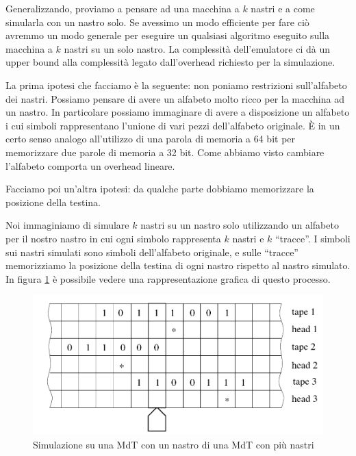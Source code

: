 

Generalizzando, proviamo a pensare ad una macchina a $k$ nastri e a come simularla con un nastro
solo. Se avessimo un modo efficiente per fare ciò avremmo un modo generale per eseguire un qualsiasi
algoritmo eseguito sulla macchina a $k$ nastri su un solo nastro. La complessità dell'emulatore ci
dà un upper bound alla complessità legato dall'overhead richiesto per la simulazione.

La prima ipotesi che facciamo è la seguente: non poniamo restrizioni sull'alfabeto dei nastri.
Possiamo pensare di avere un alfabeto molto ricco per la macchina ad un nastro. In particolare
possiamo immaginare di avere a disposizione un alfabeto i cui simboli rappresentano l'unione di vari
pezzi dell'alfabeto originale. È in un certo senso analogo all'utilizzo di una parola di memoria a
64 bit per memorizzare due parole di memoria a 32 bit. Come abbiamo visto cambiare l'alfabeto
comporta un overhead lineare.

Facciamo poi un'altra ipotesi: da qualche parte dobbiamo memorizzare la posizione della testina.

Noi immaginiamo di simulare $k$ nastri su un nastro solo utilizzando un alfabeto per il nostro
nastro in cui ogni simbolo rappresenta $k$ nastri e $k$ ``tracce''. I simboli sui nastri simulati
sono simboli dell'alfabeto originale, e sulle ``tracce'' memorizziamo la posizione della testina di
ogni nastro rispetto al nastro simulato. In figura \ref{img:KTapesToOne} è possibile vedere una rappresentazione
grafica di questo processo.

\begin{figure}[h]
    \begin{center}
        \includegraphics[scale=0.3]{./img/deterministic_complexity_classes/KTapesToOne.png}    
        \caption{Simulazione su una MdT con un nastro di una MdT con più nastri}
        \label{img:KTapesToOne}
    \end{center}
\end{figure}

